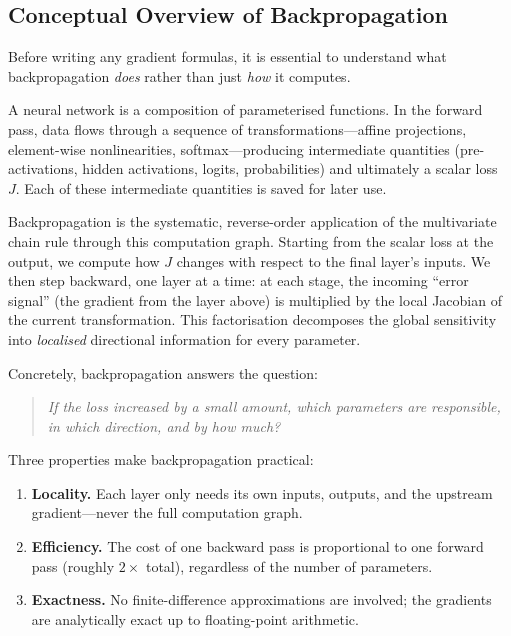\documentclass[11pt]{article}
\begin{document}
\subsection{Conceptual Overview of Backpropagation}
\label{sec:backprop-concept}

Before writing any gradient formulas, it is essential to understand what backpropagation
\emph{does} rather than just \emph{how} it computes.

A neural network is a composition of parameterised functions.  In the forward pass, data
flows through a sequence of transformations---affine projections, element-wise
nonlinearities, softmax---producing intermediate quantities (pre-activations, hidden
activations, logits, probabilities) and ultimately a scalar loss~$J$.  Each of these
intermediate quantities is saved for later use.

Backpropagation is the systematic, reverse-order application of the multivariate chain rule
through this computation graph.  Starting from the scalar loss at the output, we compute how
$J$ changes with respect to the final layer's inputs.  We then step backward, one layer at a
time: at each stage, the incoming ``error signal'' (the gradient from the layer above) is
multiplied by the local Jacobian of the current transformation.  This factorisation
decomposes the global sensitivity into \emph{localised} directional information for every
parameter.

Concretely, backpropagation answers the question:
\begin{quote}
\itshape If the loss increased by a small amount, which parameters are responsible, in which
direction, and by how much?
\end{quote}

Three properties make backpropagation practical:
\begin{enumerate}[leftmargin=2em,itemsep=0.15em]
  \item \textbf{Locality.}  Each layer only needs its own inputs, outputs, and the upstream
        gradient---never the full computation graph.
  \item \textbf{Efficiency.}  The cost of one backward pass is proportional to one forward
        pass (roughly $2{\times}$ total), regardless of the number of parameters.
  \item \textbf{Exactness.}  No finite-difference approximations are involved; the gradients
        are analytically exact up to floating-point arithmetic.
\end{enumerate}
\end{document}
